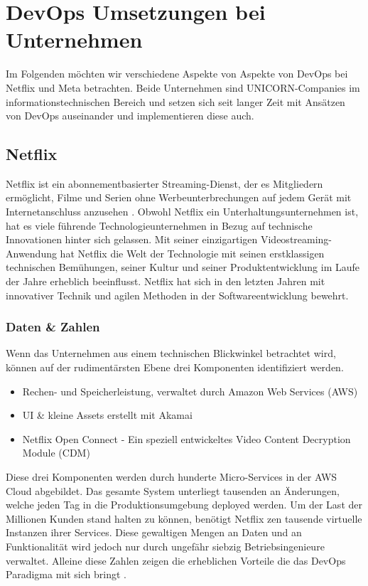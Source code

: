 \chapter{DevOps Umsetzungen bei Unternehmen}
\label{cha:evaluation}

Im Folgenden möchten wir verschiedene Aspekte von Aspekte von DevOps bei Netflix und Meta betrachten. Beide Unternehmen sind UNICORN-Companies im informationstechnischen Bereich und setzen sich seit langer Zeit mit Ansätzen von DevOps auseinander und implementieren diese auch.

\section{Netflix}
Netflix ist ein abonnementbasierter Streaming-Dienst, der es Mitgliedern ermöglicht, Filme und Serien ohne Werbeunterbrechungen auf jedem Gerät mit Internetanschluss anzusehen  \cite{Netflix}. Obwohl Netflix ein Unterhaltungsunternehmen ist, hat es viele führende Technologieunternehmen in Bezug auf technische Innovationen hinter sich gelassen. Mit seiner einzigartigen Videostreaming-Anwendung hat Netflix die Welt der Technologie mit seinen erstklassigen technischen Bemühungen, seiner Kultur und seiner Produktentwicklung im Laufe der Jahre erheblich beeinflusst. Netflix hat sich in den letzten Jahren mit innovativer Technik und agilen Methoden in der Softwareentwicklung bewehrt.

\subsection{Daten \& Zahlen}
Wenn das Unternehmen aus einem technischen Blickwinkel betrachtet wird, können auf der rudimentärsten Ebene drei Komponenten identifiziert werden. 

\begin{itemize}
	\item Rechen- und Speicherleistung, verwaltet durch Amazon Web Services (AWS)
	\item UI \& kleine Assets erstellt mit Akamai
	\item Netflix Open Connect - Ein speziell entwickeltes Video Content Decryption Module (CDM)
\end{itemize}

Diese drei Komponenten werden durch hunderte Micro-Services in der AWS Cloud abgebildet. Das gesamte System unterliegt tausenden an Änderungen, welche jeden Tag in die Produktionsumgebung deployed werden. Um der Last der Millionen Kunden stand halten zu können, benötigt Netflix zen tausende virtuelle Instanzen ihrer Services. Diese gewaltigen Mengen an Daten und an Funktionalität wird jedoch nur durch ungefähr siebzig Betriebsingenieure verwaltet. Alleine diese Zahlen zeigen die erheblichen Vorteile die das DevOps Paradigma mit sich bringt \cite{marini2019qualitative, tonse2018scalable, Hiren}. 

